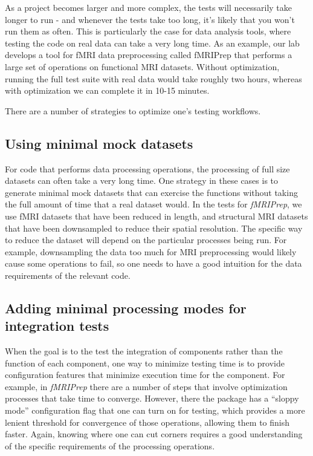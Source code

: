 As a project becomes larger and more complex, the tests will necessarily take longer to run - and whenever the tests take too long, it's likely that you won't run them as often.
This is particularly the case for data analysis tools, where testing the code on real data can take a very long time.
As an example, our lab develops a tool for fMRI data preprocessing called fMRIPrep \citep{Esteban:2019aa} that performs a large set of operations on functional MRI datasets.
Without optimization, running the full test suite with real data would take roughly two hours, whereas with optimization we can complete it in 10-15 minutes.

There are a number of strategies to optimize one's testing workflows.

\subsection{Using minimal mock datasets}

For code that performs data processing operations, the processing of full size datasets can often take a very long time.
One strategy in these cases is to generate minimal mock datasets that can exercise the functions without taking the full amount of time that a real dataset would.
In the tests for \textit{fMRIPrep}, we use fMRI datasets that have been reduced in length, and structural MRI datasets that have been downsampled to reduce their spatial resolution.
The specific way to reduce the dataset will depend on the particular processes being run.
For example, downsampling the data too much for MRI preprocessing would likely cause some operations to fail, so one needs to have a good intuition for the data requirements of the relevant code.

\subsection{Adding minimal processing modes for integration tests}

When the goal is to the test the integration of components rather than the function of each component, one way to minimize testing time is to provide configuration features that minimize execution time for the component.
For example, in \textit{fMRIPrep} there are a number of steps that involve optimization processes that take time to converge.
However, there the package has a ``sloppy mode'' configuration flag that one can turn on for testing, which provides a more lenient threshold for convergence of those operations, allowing them to finish faster.
Again, knowing where one can cut corners requires a good understanding of the specific requirements of the processing operations.

